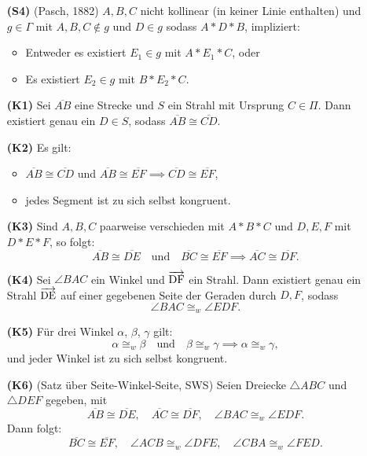 \documentclass[a4paper,12pt]{article}
\theoremstyle{break}
\begin{document}
\begin{itemize}
    \item[\textbf{(S4)}] (Pasch, 1882) \(A, B, C\) nicht kollinear (in keiner Linie enthalten) und \(g \in \Gamma\) mit \(A, B, C \notin g\) und \(D \in g\) sodass \(A * D * B\), impliziert:
    \begin{itemize}
        \item Entweder es existiert \(E_1 \in g\) mit \(A * E_1 * C\), oder
        \item Es existiert \(E_2 \in g\) mit \(B * E_2 * C\).
    \end{itemize}
    \item[\textbf{(K1)}] Sei \(\overline{AB}\) eine Strecke und \(S\) ein Strahl mit Ursprung \(C \in \Pi\). Dann existiert genau ein \(D \in S\), sodass \(\overline{AB} \cong \overline{CD}\).
    \item[\textbf{(K2)}] Es gilt:
    \begin{itemize}
        \item \(\overline{AB} \cong \overline{CD}\) und \(\overline{AB} \cong \overline{EF} \implies \overline{CD} \cong \overline{EF}\),
        \item jedes Segment ist zu sich selbst kongruent.
    \end{itemize}
    \item[\textbf{(K3)}] Sind \(A, B, C\) paarweise verschieden mit \(A * B * C\) und \(D, E, F\) mit \(D * E * F\), so folgt:
    \[
    \overline{AB} \cong \overline{DE} \quad \text{und} \quad \overline{BC} \cong \overline{EF} \implies \overline{AC} \cong \overline{DF}.
    \]
    \item[\textbf{(K4)}]
    Sei \(\angle BAC\) ein Winkel und \(\overrightarrow{\rm DF}\) ein Strahl. Dann existiert genau ein Strahl \(\overrightarrow{\rm DE}\) auf einer gegebenen Seite der Geraden durch \(D, F\), sodass 
    \[
    \angle BAC \cong_w \angle EDF.
    \]
    \item[\textbf{(K5)}]
    Für drei Winkel \(\alpha\), \(\beta\), \(\gamma\) gilt:
    \[
    \alpha \cong_w \beta \quad \text{und} \quad \beta \cong_w \gamma \implies \alpha \cong_w \gamma,
    \]
    und jeder Winkel ist zu sich selbst kongruent.
    \item[\textbf{(K6)}]
    (Satz über Seite-Winkel-Seite, SWS) Seien Dreiecke \(\triangle ABC\) und \(\triangle DEF\) gegeben, mit
    \[
    \overline{AB} \cong \overline{DE}, \quad \overline{AC} \cong \overline{DF}, \quad \angle BAC \cong_w \angle EDF.
    \]
    Dann folgt:
    \[
    \overline{BC} \cong \overline{EF}, \quad \angle ACB \cong_w \angle DFE, \quad \angle CBA \cong_w \angle FED.
    \]
\end{itemize}
\end{document}
